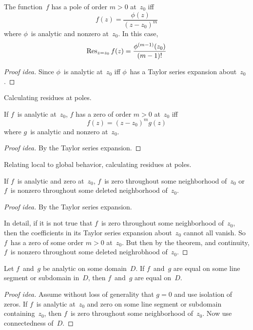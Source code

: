 \begin{thm}
The function~\(f\) has a pole of order \(m>0\) at~\(z_0\) iff
\[f(z)=\frac{\phi(z)}{(z-z_0)^m}\]
where \(\phi\)~is analytic and nonzero at~\(z_0\). In this case,
\[\operatorname{Res}_{z=z_0}f(z)=\frac{\phi^{(m-1)}(z_0)}{(m-1)!}\]
\end{thm}
\begin{proof}[Proof idea]
Since \(\phi\)~is analytic at~\(z_0\) iff \(\phi\)~has a Taylor series expansion about~\(z_0\).
\end{proof}
\begin{app}
Calculating residues at poles.
\end{app}

\begin{thm}
If \(f\)~is analytic at~\(z_0\), \(f\) has a zero of order \(m>0\) at~\(z_0\) iff
\[f(z)=(z-z_0)^m g(z)\]
where \(g\)~is analytic and nonzero at~\(z_0\).
\end{thm}
\begin{proof}[Proof idea]
By the Taylor series expansion.
\end{proof}
\begin{app}
Relating local to global behavior, calculating residues at poles.
\end{app}

\begin{cor}
If \(f\)~is analytic and zero at~\(z_0\), \(f\)~is zero throughout some neighborhood of~\(z_0\) or \(f\)~is nonzero throughout some deleted neighborhood of~\(z_0\). 
\end{cor}
\begin{proof}[Proof idea]
By the Taylor series expansion.

In detail, if it is not true that \(f\)~is zero throughout some neighborhood of~\(z_0\), then the coefficients in its Taylor series expansion about~\(z_0\) cannot all vanish. So \(f\)~has a zero of some order \(m>0\) at~\(z_0\). But then by the theorem, and continuity, \(f\)~is nonzero throughout some deleted neighrobhood of~\(z_0\).
\end{proof}

\begin{cor}
Let \(f\)~and~\(g\) be analytic on some domain~\(D\). If \(f\)~and~\(g\) are equal on some line segment or subdomain in~\(D\), then \(f\)~and~\(g\) are equal on~\(D\).
\end{cor}
\begin{proof}[Proof idea]
Assume without loss of generality that \(g=0\) and use isolation of zeros. If \(f\)~is analytic at~\(z_0\) and zero on some line segment or subdomain containing~\(z_0\), then \(f\)~is zero throughout some neighborhood of~\(z_0\). Now use connectedness of~\(D\).
\end{proof}

